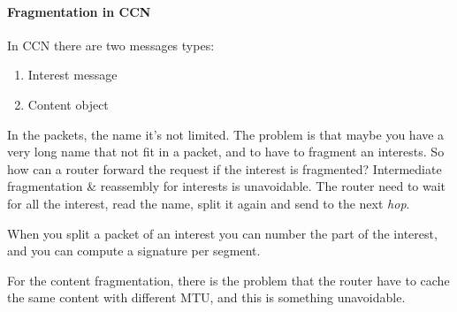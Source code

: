 \paragraph{Fragmentation in CCN} In CCN there are two messages types:
\begin{enumerate}
  \item Interest message
  \item Content object
\end{enumerate}
In the packets, the name it's not limited. The problem is that maybe you have a
very long name that not fit in a packet, and to have to fragment an interests.
So how can a router forward the request if the interest is fragmented?
Intermediate fragmentation & reassembly for interests is unavoidable. The
router need to wait for all the interest, read the name, split it again and
send to the next \textit{hop}.

When you split a packet of an interest you can number the part of the interest,
and you can compute a signature per segment.

For the content fragmentation, there is the problem that the router have to
cache the same content with different MTU, and this is something unavoidable.
